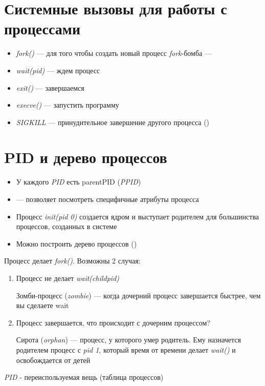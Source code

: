 \documentclass[../../lectures.tex]{subfiles}
\begin{document}
\section{Системные вызовы для работы с процессами}
\begin{itemize}
    \item \emph{fork()} --- для того чтобы создать новый процесс
    \emph{fork}-бомба --- \todo{}
    \item \emph{wait(pid)} --- ждем процесс
    \item \emph{exit()} --- завершаемся
    \item \emph{execve()} --- запустить программу
    \item \emph{SIGKILL} --- принудительное завершение другого процесса () 
\end{itemize}

\section{PID и дерево процессов}
\begin{itemize}
    \item У каждого \emph{PID} есть parentPID (\emph{PPID})

    \item {} --- позволяет посмотреть специфичные атрибуты процесса

    \item Процесс \emph{init(pid 0)} создается ядром и выступает родителем для большинства процессов, созданных в системе

    \item Можно построить дерево процессов ()
\end{itemize}

Процесс делает \emph{fork()}. Возможны 2 случая:
\begin{enumerate}
    \item 
        Процесс не делает \emph{wait(childpid)}

        Зомби-процесс (\emph{zombie}) --- когда дочерний процесс завершается быстрее, чем вы сделаете wait
    \item 
        Процесс завершается, что происходит с дочерним процессом?

        Сирота (\emph{orphan}) --- процесс, у которого умер родитель. 
        Ему назначется родителем процесс с \emph{pid 1}, который время от времени делает \emph{wait()} и освобождается от детей
\end{enumerate}
\emph{PID} - переиспользуемая вещь (таблица процессов)
\end{document}
